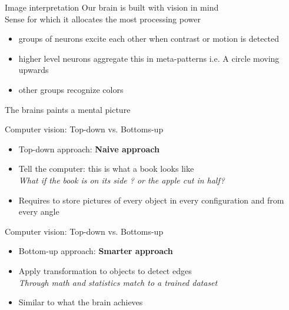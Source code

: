 \documentclass{beamer}
\begin{document}
\begin{frame}{Image interpretation}
Our brain is built with vision in mind \\
Sense for which it allocates the most processing power \\
\begin{itemize}
\item groups of neurons excite each other when contrast or motion is detected
\item higher level neurons aggregate this in meta-patterns i.e. A circle moving upwards
\item other groups recognize colors
\end{itemize}
The brains paints a mental picture
\end{frame}

\begin{frame}{Computer vision: Top-down vs. Bottoms-up}
    \begin{itemize}
        \item Top-down approach: \textbf{Naive approach} \\
        \item Tell the computer: this is what a book looks like \\
            \hspace{0.27cm} \textit{What if the book is on its side ? or the apple cut in half?} \\
        \item Requires to store pictures of every object in every configuration and from every angle
    \end{itemize}
\end{frame}

\begin{frame}{Computer vision: Top-down vs. Bottoms-up}
    \begin{itemize}
        \item Bottom-up approach: \textbf{Smarter approach} \\
        \item Apply transformation to objects to detect edges \\
            \hspace{0.27cm}\textit{Through math and statistics match to a trained dataset} \\
        \item Similar to what the brain achieves

\end{itemize}
    \end{frame}
\end{document}
